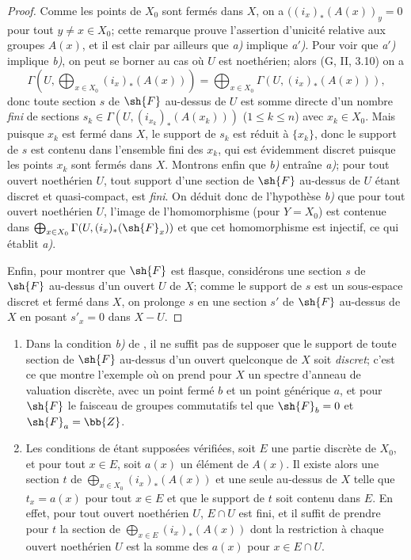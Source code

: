 \begin{proof}
Comme les points de $X_0$ sont fermés dans $X$, on a $((i_x)_*(A(x))_y=0$ pour tout
$y\neq x\in X_0$;
cette remarque prouve l'assertion d'unicité relative aux groupes $A(x)$, et il est clair par ailleurs que \emph{a)} implique \emph{a$'$)}.
Pour voir que \emph{a$'$)} implique \emph{b)}, on peut se borner au cas où $U$ est noethérien;
alors (G, II, 3.10) on a
\[
  \Gamma(U,\bigoplus_{x\in X_0}(i_x)_*(A(x)))
  =\bigoplus_{x\in X_0}\Gamma(U,(i_x)_*(A(x))),
\]
donc toute section $s$ de $\sh{F}$ au-dessus de $U$ est somme directe d'un nombre \emph{fini} de sections $s_k\in\Gamma(U,(i_{x_k})_*(A(x_k)))$ ($1\leq k\leq n$) avec $x_k\in X_0$.
Mais puisque $x_k$ est fermé dans $X$, le support de $s_k$ est réduit à $\{x_k\}$, donc le support de $s$ est contenu dans l'ensemble fini des $x_k$, qui est évidemment discret puisque les points $x_k$ sont fermés dans $X$.
Montrons enfin que \emph{b)} entraîne \emph{a)};
pour tout ouvert noethérien $U$, tout support d'une section de $\sh{F}$ au-dessus de $U$ étant discret et quasi-compact, est \emph{fini}.
On déduit donc de l'hypothèse \emph{b)} que pour tout ouvert noethérien $U$, l'image de l'homomorphisme  (pour $Y=X_0$) est contenue dans $\bigoplus_{x\in X_0}\Gamma(U,(i_x)_*(\sh{F}_x))$ et que cet homomorphisme est injectif, ce qui établit \emph{a)}.

Enfin, pour montrer que $\sh{F}$ est flasque, considérons une section $s$ de $\sh{F}$ au-dessus d'un ouvert $U$ de $X$;
comme le support de $s$ est un sous-espace discret et fermé dans $X$, on prolonge $s$ en une section $s'$ de $\sh{F}$ au-dessus de $X$ en posant $s'_x=0$ dans $X-U$.
\end{proof}

\begin{remark}[21.9.3]
\label{IV.21.9.3}
\begin{enumerate}[label=(\roman*)]
  \item Dans la condition \emph{b)} de , il ne suffit pas de supposer que le support de toute section de $\sh{F}$ au-dessus d'un ouvert quelconque de $X$ soit \emph{discret};
c'est ce que montre l'exemple où on prend pour $X$ un spectre d'anneau de valuation discrète, avec un point fermé $b$ et un point générique $a$, et pour $\sh{F}$ le faisceau de groupes commutatifs tel que $\sh{F}_b=0$ et $\sh{F}_a=\bb{Z}$.

  \item Les conditions de  étant supposées vérifiées, soit $E$ une partie discrète de $X_0$, et pour tout $x\in E$, soit $a(x)$ un élément de $A(x)$.
Il existe alors une section $t$ de $\bigoplus_{x\in X_0}(i_x)_*(A(x))$ et une seule au-dessus de $X$ telle que $t_x=a(x)$ pour tout $x\in E$ et que le support de $t$ soit contenu dans $E$.
En effet, pour tout ouvert noethérien $U$, $E\cap U$ est fini, et il suffit de prendre pour $t$ la section de $\bigoplus_{x\in E}(i_x)_*(A(x))$ dont la restriction à chaque ouvert noethérien $U$ est la somme des $a(x)$ pour $x\in E\cap U$.
\end{enumerate}
\end{remark}


